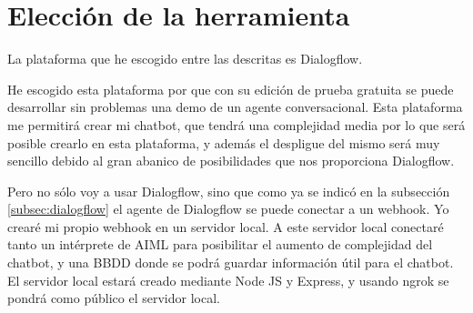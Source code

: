 \section{Elección de la herramienta}

La plataforma que he escogido entre las descritas es Dialogflow.

He escogido esta plataforma por que con su edición de prueba gratuita se puede desarrollar sin problemas una demo de un agente conversacional. Esta plataforma me permitirá crear mi chatbot, que tendrá una complejidad media por lo que será posible crearlo en esta plataforma, y además el despligue del mismo será muy sencillo debido al gran abanico de posibilidades que nos proporciona Dialogflow.

Pero no sólo voy a usar Dialogflow, sino que como ya se indicó en la subsección \ref{subsec:dialogflow} el agente de Dialogflow se puede conectar a un webhook. Yo crearé mi propio webhook en un servidor local. A este servidor local conectaré tanto un intérprete de AIML para posibilitar el aumento de complejidad del chatbot, y una BBDD donde se podrá guardar información útil para el chatbot. El servidor local estará creado mediante Node JS y Express, y usando ngrok se pondrá como público el servidor local.
